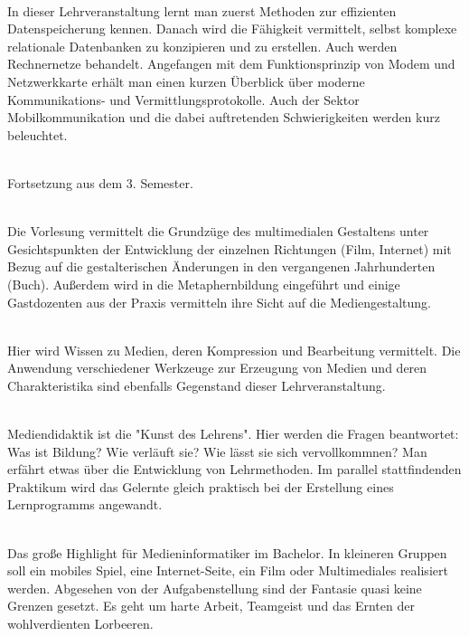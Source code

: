 \textbf{} \\
In dieser Lehrveranstaltung lernt man zuerst Methoden zur effizienten Datenspeicherung kennen.
Danach wird die Fähigkeit vermittelt, selbst komplexe relationale Datenbanken zu konzipieren und zu erstellen.
Auch werden Rechnernetze behandelt.
Angefangen mit dem Funktionsprinzip von Modem und Netzwerkkarte erhält man einen kurzen Überblick über moderne Kommunikations- und Vermittlungsprotokolle.
Auch der Sektor Mobilkommunikation und die dabei auftretenden Schwierigkeiten werden kurz beleuchtet.

\textbf{} \\
Fortsetzung aus dem 3. Semester.

\textbf{} \\
Die Vorlesung vermittelt die Grundzüge des multimedialen Gestaltens unter Gesichtspunkten der Entwicklung der einzelnen Richtungen (Film, Internet) mit Bezug auf die gestalterischen Änderungen in den vergangenen Jahrhunderten (Buch).
Außerdem wird in die Metaphernbildung eingeführt und einige Gastdozenten aus der Praxis vermitteln ihre Sicht auf die Mediengestaltung.

\textbf{} \\
Hier wird Wissen zu Medien, deren Kompression und Bearbeitung vermittelt.
Die Anwendung verschiedener Werkzeuge zur Erzeugung von Medien und deren Charakteristika sind ebenfalls Gegenstand dieser Lehrveranstaltung.

\textbf{} \\
Mediendidaktik ist die "Kunst des Lehrens".
Hier werden die Fragen beantwortet:
Was ist Bildung?
Wie verläuft sie?
Wie lässt sie sich vervollkommnen?
Man erfährt etwas über die Entwicklung von Lehrmethoden.
Im parallel stattfindenden Praktikum wird das Gelernte gleich praktisch bei der Erstellung eines Lernprogramms angewandt.

\textbf{} \\
Das große Highlight für Medieninformatiker im Bachelor.
In kleineren Gruppen soll ein mobiles Spiel, eine Internet-Seite, ein Film oder Multimediales realisiert werden.
Abgesehen von der Aufgabenstellung sind der Fantasie quasi keine Grenzen gesetzt.
Es geht um harte Arbeit, Teamgeist und das Ernten der wohlverdienten Lorbeeren.

